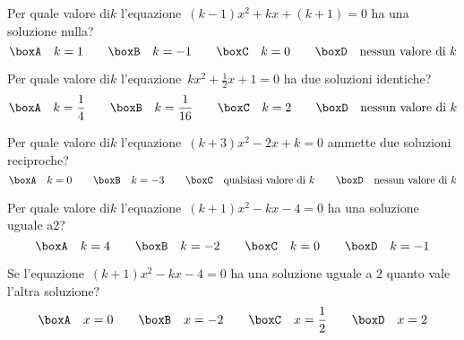 \begin{esercizio}
 \label{ese:3.107}
Per quale valore di$k$ l'equazione~$(k-1) x^{2} + kx + (k + 1) = 0$ ha una 
soluzione nulla?
\[\boxA\quad k = 1\qquad\boxB\quad k = -1\qquad\boxC\quad k =0\qquad\boxD\quad 
\text{nessun valore di }k\]
\end{esercizio}

\begin{esercizio}
 \label{ese:3.108}
Per quale valore di$k$ l'equazione~$kx^{2} + \frac{1}{2} x + 1 = 0$ ha due 
soluzioni identiche?
\[\boxA\quad k = \frac{1}{4}\qquad\boxB\quad k = \frac{1}{16}\qquad\boxC\quad k 
= 2\qquad\boxD\quad \text{nessun valore di }k\]
\end{esercizio}

\begin{esercizio}
 \label{ese:3.109}
Per quale valore di$k$ l'equazione~$(k + 3) x^{2}-2x + k = 0$ ammette due 
soluzioni reciproche?
\[\boxA\quad k = 0\qquad\boxB\quad k = -3\qquad\boxC\quad \text{qualsiasi valore 
di }k\qquad\boxD\quad \text{nessun valore di }k\]
\end{esercizio}

\begin{esercizio}
 \label{ese:3.110}
Per quale valore di$k$ l'equazione~$(k + 1) x^{2}-kx-4 = 0$ ha una soluzione 
uguale a$2$?
\[\boxA\quad k = 4\qquad\boxB\quad k =-2\qquad\boxC\quad k = 0\qquad\boxD\quad k 
=-1\]
\end{esercizio}

\begin{esercizio}
 \label{ese:3.111}
Se l'equazione~$(k + 1) x^{2}-kx-4 = 0$ ha una soluzione uguale a $2$ quanto 
vale l'altra soluzione?
\[\boxA\quad x = 0\qquad\boxB\quad x =-2\qquad\boxC\quad x = 
\frac{1}{2}\qquad\boxD\quad x = 2\]
\end{esercizio}

